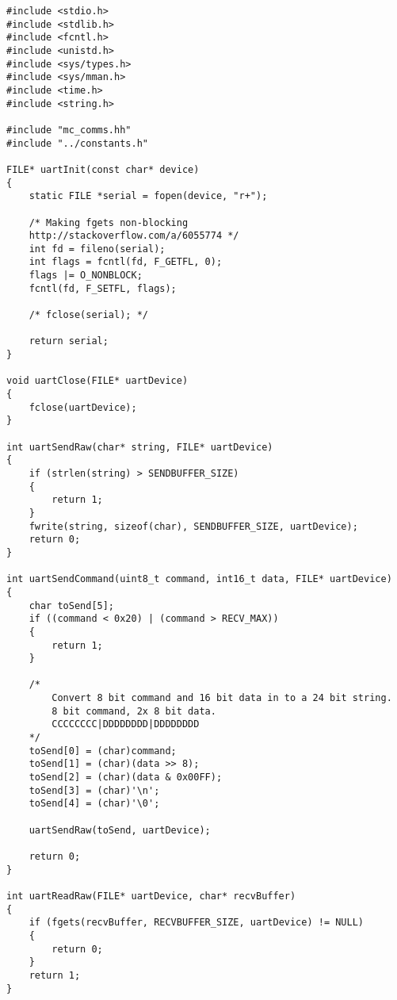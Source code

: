 \documentclass[a4paper,11pt]{article}
\begin{document}
\linespread{0.8}
\begin{lstlisting}
#include <stdio.h>
#include <stdlib.h>
#include <fcntl.h>
#include <unistd.h>
#include <sys/types.h>
#include <sys/mman.h>
#include <time.h>
#include <string.h>

#include "mc_comms.hh"
#include "../constants.h"

FILE* uartInit(const char* device)
{
    static FILE *serial = fopen(device, "r+");
    
    /* Making fgets non-blocking 
    http://stackoverflow.com/a/6055774 */
    int fd = fileno(serial);
    int flags = fcntl(fd, F_GETFL, 0);
    flags |= O_NONBLOCK;
    fcntl(fd, F_SETFL, flags);
    
    /* fclose(serial); */
    
    return serial;
}

void uartClose(FILE* uartDevice)
{
    fclose(uartDevice);
}

int uartSendRaw(char* string, FILE* uartDevice)
{
    if (strlen(string) > SENDBUFFER_SIZE)
    {
        return 1;
    }
    fwrite(string, sizeof(char), SENDBUFFER_SIZE, uartDevice);
    return 0;
}

int uartSendCommand(uint8_t command, int16_t data, FILE* uartDevice)
{
    char toSend[5];
    if ((command < 0x20) | (command > RECV_MAX))
    {
        return 1;
    }
    
    /*
        Convert 8 bit command and 16 bit data in to a 24 bit string.
        8 bit command, 2x 8 bit data.
        CCCCCCCC|DDDDDDDD|DDDDDDDD
    */
    toSend[0] = (char)command;
    toSend[1] = (char)(data >> 8);
    toSend[2] = (char)(data & 0x00FF);
    toSend[3] = (char)'\n';
    toSend[4] = (char)'\0';
    
    uartSendRaw(toSend, uartDevice);
    
    return 0;
}

int uartReadRaw(FILE* uartDevice, char* recvBuffer)
{    
    if (fgets(recvBuffer, RECVBUFFER_SIZE, uartDevice) != NULL)
    {
        return 0;
    }
    return 1;
}
\end{lstlisting}
\end{document}
